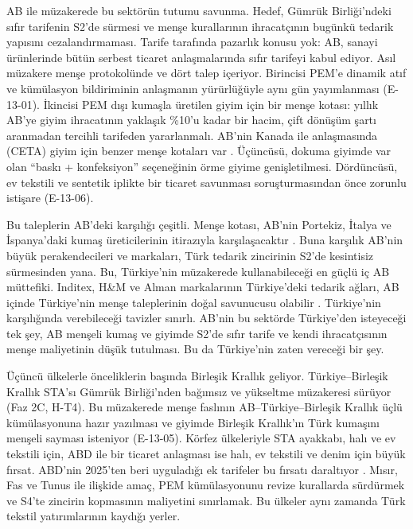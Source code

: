 AB ile müzakerede bu sektörün tutumu savunma. Hedef, Gümrük Birliği'ndeki sıfır tarifenin S2'de sürmesi ve menşe kurallarının ihracatçının bugünkü tedarik yapısını cezalandırmaması. Tarife tarafında pazarlık konusu yok: AB, sanayi ürünlerinde bütün serbest ticaret anlaşmalarında sıfır tarifeyi kabul ediyor. Asıl müzakere menşe protokolünde ve dört talep içeriyor. Birincisi PEM'e dinamik atıf ve kümülasyon bildiriminin anlaşmanın yürürlüğüyle aynı gün yayımlanması (E-13-01). İkincisi PEM dışı kumaşla üretilen giyim için bir menşe kotası: yıllık AB'ye giyim ihracatının yaklaşık \%10'u kadar bir hacim, çift dönüşüm şartı aranmadan tercihli tarifeden yararlanmalı. AB'nin Kanada ile anlaşmasında (CETA) giyim için benzer menşe kotaları var \etiketD{}. Üçüncüsü, dokuma giyimde var olan ``baskı + konfeksiyon'' seçeneğinin örme giyime genişletilmesi. Dördüncüsü, ev tekstili ve sentetik iplikte bir ticaret savunması soruşturmasından önce zorunlu istişare (E-13-06).

Bu taleplerin AB'deki karşılığı çeşitli. Menşe kotası, AB'nin Portekiz, İtalya ve İspanya'daki kumaş üreticilerinin itirazıyla karşılaşacaktır \etiketH{}. Buna karşılık AB'nin büyük perakendecileri ve markaları, Türk tedarik zincirinin S2'de kesintisiz sürmesinden yana. Bu, Türkiye'nin müzakerede kullanabileceği en güçlü iç AB müttefiki. Inditex, H\&M ve Alman markalarının Türkiye'deki tedarik ağları, AB içinde Türkiye'nin menşe taleplerinin doğal savunucusu olabilir \etiketH{}. Türkiye'nin karşılığında verebileceği tavizler sınırlı. AB'nin bu sektörde Türkiye'den isteyeceği tek şey, AB menşeli kumaş ve giyimde S2'de sıfır tarife ve kendi ihracatçısının menşe maliyetinin düşük tutulması. Bu da Türkiye'nin zaten vereceği bir şey.

Üçüncü ülkelerle önceliklerin başında Birleşik Krallık geliyor. Türkiye--Birleşik Krallık STA'sı Gümrük Birliği'nden bağımsız ve yükseltme müzakeresi sürüyor (Faz 2C, H-T4). Bu müzakerede menşe faslının AB--Türkiye--Birleşik Krallık üçlü kümülasyonuna hazır yazılması ve giyimde Birleşik Krallık'ın Türk kumaşını menşeli sayması isteniyor (E-13-05). Körfez ülkeleriyle STA ayakkabı, halı ve ev tekstili için, ABD ile bir ticaret anlaşması ise halı, ev tekstili ve denim için büyük fırsat. ABD'nin 2025'ten beri uyguladığı ek tarifeler bu fırsatı daraltıyor \etiketD{}. Mısır, Fas ve Tunus ile ilişkide amaç, PEM kümülasyonunu revize kurallarda sürdürmek ve S4'te zincirin kopmasının maliyetini sınırlamak. Bu ülkeler aynı zamanda Türk tekstil yatırımlarının kaydığı yerler.

